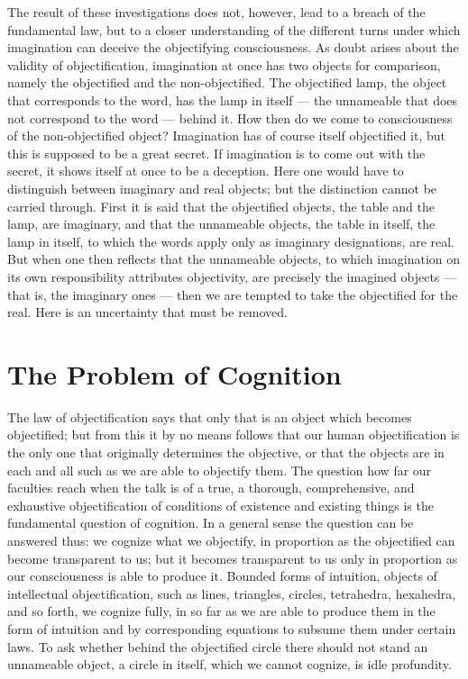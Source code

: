 \documentclass[12pt]{book}
\begin{document}
The result of these investigations does not, however, lead to a breach of the
fundamental law, but to a closer understanding of the different turns under
which imagination can deceive the objectifying consciousness. As doubt arises
about the validity of objectification, imagination at once has two objects for
comparison, namely the objectified and the non-objectified. The objectified
lamp, the object that corresponds to the word, has the lamp in itself --- the
unnameable that does not correspond to the word --- behind it. How then do we
come to consciousness of the non-objectified object? Imagination has of course
itself objectified it, but this is supposed to be a great secret. If imagination
is to come out with the secret, it shows itself at once to be a deception. Here
one would have to distinguish between imaginary and real objects; but the
distinction cannot be carried through. First it is said that the objectified
objects, the table and the lamp, are imaginary, and that the unnameable objects,
the table in itself, the lamp in itself, to which the words apply only as
imaginary designations, are real. But when one then reflects that the unnameable
objects, to which imagination on its own responsibility attributes objectivity,
are precisely the imagined objects --- that is, the imaginary ones --- then we
are tempted to take the objectified for the real. Here is an uncertainty that
must be removed.

\section{The Problem of Cognition}
\label{sec:6}

\noindent The law of objectification says that only that is an object which
becomes objectified; but from this it by no means follows that our human
objectification is the only one that originally determines the objective, or
that the objects are in each and all such as we are able to objectify them. The
question how far our faculties reach when the talk is of a true, a thorough,
comprehensive, and exhaustive objectification of conditions of existence and
existing things is the fundamental question of cognition. In a general sense
the question can be answered thus: we cognize what we objectify, in proportion
as the objectified can become transparent to us; but it becomes transparent to
us only in proportion as our consciousness is able to produce it. Bounded forms
of intuition, objects of intellectual objectification, such as lines,
triangles, circles, tetrahedra, hexahedra, and so forth, we cognize fully, in
so far as we are able to produce them in the form of intuition and by
corresponding equations to subsume them under certain laws. To ask whether
behind the objectified circle there should not stand an unnameable object, a
circle in itself, which we cannot cognize, is idle profundity.
\end{document}
